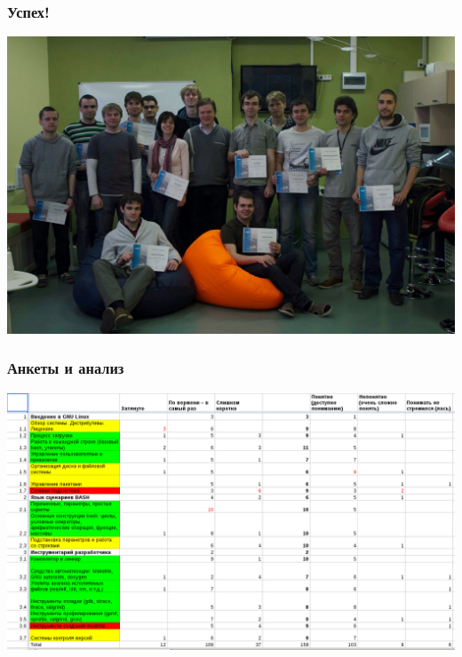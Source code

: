 \begin{frame}
  \frametitle{Успех!}
  \includegraphics[width=\textwidth]{linux_courses_certificates1.jpg}
\end{frame}

\begin{frame}
  \frametitle{Анкеты и анализ}
  \includegraphics[width=\textwidth]{anketa.png}
\end{frame}

